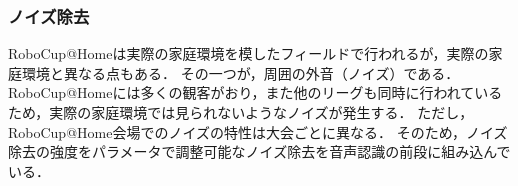 \documentclass[a4j]{jarticle}
\begin{document}
\subsubsection{ノイズ除去}
RoboCup@Homeは実際の家庭環境を模したフィールドで行われるが，実際の家庭環境と異なる点もある．
その一つが，周囲の外音（ノイズ）である．
RoboCup@Homeには多くの観客がおり，また他のリーグも同時に行われているため，実際の家庭環境では見られないようなノイズが発生する．
ただし，RoboCup@Home会場でのノイズの特性は大会ごとに異なる．
そのため，ノイズ除去の強度をパラメータで調整可能なノイズ除去\cite{sainburg2020finding}を音声認識の前段に組み込んでいる．

%
\end{document}

